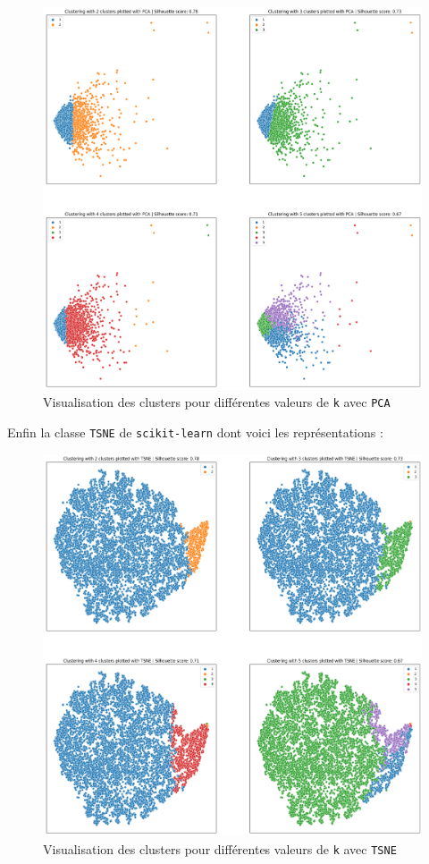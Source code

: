 \documentclass{article}
\begin{document}
\begin{figure}[ht]
  \centering
  \includegraphics[width=1\textwidth]{img/clustering_PCA.png}
  \caption{Visualisation des clusters pour différentes valeurs de \texttt{k} avec \texttt{PCA}}
\end{figure}
\newpage

Enfin la classe \texttt{TSNE} de \texttt{scikit-learn} dont voici les représentations :

\begin{figure}[ht]
  \centering
  \includegraphics[width=1\textwidth]{img/clustering_TSNE.png}
  \caption{Visualisation des clusters pour différentes valeurs de \texttt{k} avec \texttt{TSNE}}
\end{figure}
\newpage
\end{document}
